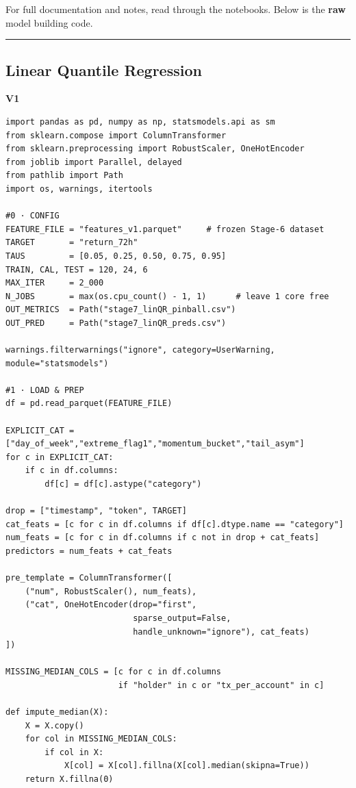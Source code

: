 \documentclass[
  a4paper,
  DIV=11,
  numbers=noendperiod]{scrreprt}
\begin{document}
For full documentation and notes, read through the notebooks. Below is
the \textbf{raw} model building code.

\begin{center}\rule{0.5\linewidth}{0.5pt}\end{center}

\subsection{Linear Quantile
Regression}\label{linear-quantile-regression}

\textbf{V1}

\begin{verbatim}
import pandas as pd, numpy as np, statsmodels.api as sm
from sklearn.compose import ColumnTransformer
from sklearn.preprocessing import RobustScaler, OneHotEncoder
from joblib import Parallel, delayed
from pathlib import Path
import os, warnings, itertools

#0 · CONFIG
FEATURE_FILE = "features_v1.parquet"     # frozen Stage-6 dataset
TARGET       = "return_72h"
TAUS         = [0.05, 0.25, 0.50, 0.75, 0.95]
TRAIN, CAL, TEST = 120, 24, 6
MAX_ITER     = 2_000
N_JOBS       = max(os.cpu_count() - 1, 1)      # leave 1 core free
OUT_METRICS  = Path("stage7_linQR_pinball.csv")
OUT_PRED     = Path("stage7_linQR_preds.csv")

warnings.filterwarnings("ignore", category=UserWarning, module="statsmodels")

#1 · LOAD & PREP
df = pd.read_parquet(FEATURE_FILE)

EXPLICIT_CAT = ["day_of_week","extreme_flag1","momentum_bucket","tail_asym"]
for c in EXPLICIT_CAT:
    if c in df.columns:
        df[c] = df[c].astype("category")

drop = ["timestamp", "token", TARGET]
cat_feats = [c for c in df.columns if df[c].dtype.name == "category"]
num_feats = [c for c in df.columns if c not in drop + cat_feats]
predictors = num_feats + cat_feats

pre_template = ColumnTransformer([
    ("num", RobustScaler(), num_feats),
    ("cat", OneHotEncoder(drop="first",
                          sparse_output=False,
                          handle_unknown="ignore"), cat_feats)
])

MISSING_MEDIAN_COLS = [c for c in df.columns
                       if "holder" in c or "tx_per_account" in c]

def impute_median(X):
    X = X.copy()
    for col in MISSING_MEDIAN_COLS:
        if col in X:
            X[col] = X[col].fillna(X[col].median(skipna=True))
    return X.fillna(0)


\end{verbatim}
\end{document}
